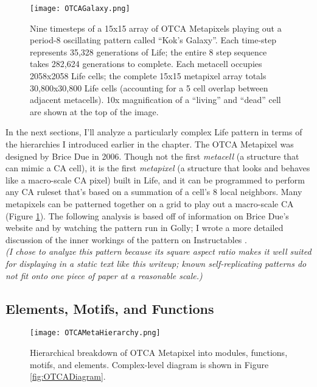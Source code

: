 {\begin{figure}
  \texttt{[image: OTCAGalaxy.png]}
  \caption{Nine timesteps of a 15x15 array of OTCA Metapixels playing out a period-8 oscillating pattern called ``Kok's Galaxy''.  Each time-step represents 35,328 generations of Life; the entire 8 step sequence takes 282,624 generations to complete.  Each metacell occupies 2058x2058 Life cells; the complete 15x15 metapixel array totals 30,800x30,800 Life cells (accounting for a 5 cell overlap between adjacent metacells).  10x magnification of a ``living'' and ``dead'' cell are shown at the top of the image.}
  \label{fig:OTCAGalaxy}
\end{figure}

In the next sections, I'll analyze a particularly complex Life pattern in terms of the hierarchies I introduced earlier in the chapter.  The OTCA Metapixel was designed by Brice Due in 2006.  Though not the first \textit{metacell} (a structure that can mimic a CA cell), it is the first \textit{metapixel} (a structure that looks and behaves like a macro-scale CA pixel) built in Life, and it can be programmed to perform any CA ruleset that's based on a summation of a cell's 8 local neighbors.  Many metapixels can be patterned together on a grid to play out a macro-scale CA (Figure \ref{fig:OTCAGalaxy}).  The following analysis is based off of information on Brice Due's website \cite{Due2006} and by watching the pattern run in Golly; I wrote a more detailed discussion of the inner workings of the pattern on Instructables \cite{Ghassaei2015}.\\

\textit{(I chose to analyze this pattern because its square aspect ratio makes it well suited for displaying in a static text like this writeup; known self-replicating patterns do not fit onto one piece of paper at a reasonable scale.)}  

\subsection{Elements, Motifs, and Functions}

\begin{sidewaysfigure}
  \texttt{[image: OTCAMetaHierarchy.png]}
  \caption{Hierarchical breakdown of OTCA Metapixel into modules, functions, motifs, and elements.  Complex-level diagram is shown in Figure \ref{fig:OTCADiagram}.}
  \label{fig:OTCAMetaHierarchy}
\end{sidewaysfigure}

}
